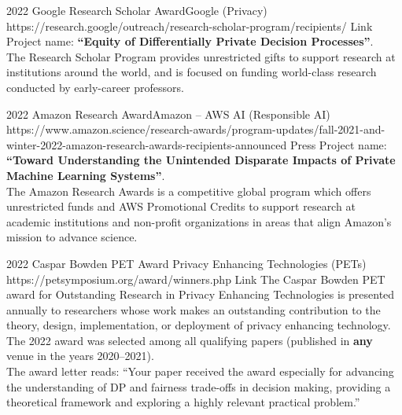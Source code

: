  

\begin{awards}
	\awardentryD
	{2022}
	{Google Research Scholar Award}{Google (Privacy)}
	{https://research.google/outreach/research-scholar-program/recipients/}
	{Link}
	{
	Project name: \textbf{``Equity of Differentially Private Decision Processes''}.\\
	The Research Scholar Program provides unrestricted gifts to support research at institutions around the world, and is focused on funding world-class research conducted by early-career professors.
	}

	\awardentryD
	{2022}
	{Amazon Research Award}{Amazon -- AWS AI (Responsible AI)}
	{https://www.amazon.science/research-awards/program-updates/fall-2021-and-winter-2022-amazon-research-awards-recipients-announced}%
	{Press}
	{
	Project name: \textbf{``Toward Understanding the Unintended Disparate Impacts of Private Machine Learning Systems''}.\\
	The Amazon Research Awards is a competitive global program which offers unrestricted funds and AWS Promotional Credits to support research at academic institutions and non-profit organizations in areas that align Amazon's mission to advance science.}

	\awardentryD
	{2022}
	{Caspar Bowden PET Award}%
	{Privacy Enhancing Technologies (PETs)}
	{https://petsymposium.org/award/winners.php}
	{Link}
	{The Caspar Bowden PET award for Outstanding Research in Privacy Enhancing Technologies is presented annually to researchers 
	whose work makes an outstanding contribution to the theory, design, implementation, or deployment of privacy enhancing technology. The 2022 award was selected among all qualifying papers (published in \textbf{any} venue in the years 2020--2021).\\
	The award letter reads: ``Your paper  received the award especially for advancing the understanding of DP and fairness trade-offs in decision making, providing a theoretical framework and exploring a highly relevant practical problem.''}


\end{awards}
